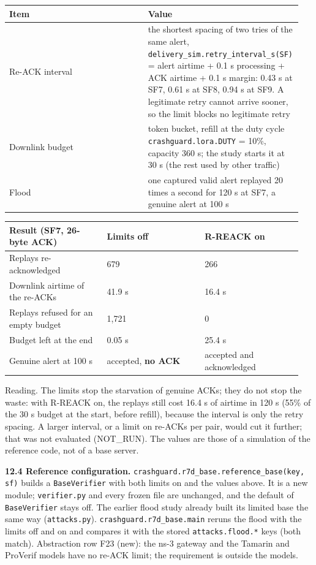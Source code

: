 {\scriptsize\raggedright
\begin{longtable}{p{0.475\linewidth}p{0.475\linewidth}}
\toprule
Item & Value \\
\midrule
\endhead
Re-ACK interval & the shortest spacing of two tries of the same alert, \texttt{delivery\_sim.retry\_interval\_s(SF)} = alert airtime + 0.1 s processing + ACK airtime + 0.1 s margin: 0.43 s at SF7, 0.61 s at SF8, 0.94 s at SF9. A legitimate retry cannot arrive sooner, so the limit blocks no legitimate retry \\
Downlink budget & token bucket, refill at the duty cycle \texttt{crashguard.lora.DUTY} = 10\%, capacity 360 s; the study starts it at 30 s (the rest used by other traffic) \\
Flood & one captured valid alert replayed 20 times a second for 120 s at SF7, a genuine alert at 100 s \\
\bottomrule
\end{longtable}}

{\scriptsize\raggedright
\begin{longtable}{p{0.317\linewidth}p{0.317\linewidth}p{0.317\linewidth}}
\toprule
Result (SF7, 26-byte ACK) & Limits off & R-REACK on \\
\midrule
\endhead
Replays re-acknowledged & 679 & 266 \\
Downlink airtime of the re-ACKs & 41.9 s & 16.4 s \\
Replays refused for an empty budget & 1,721 & 0 \\
Budget left at the end & 0.05 s & 25.4 s \\
Genuine alert at 100 s & accepted, \textbf{no ACK} & accepted and acknowledged \\
\bottomrule
\end{longtable}}

Reading. The limits stop the starvation of genuine ACKs; they do not stop the waste: with R-REACK on, the replays still cost 16.4 s of airtime in 120 s (55\% of the 30 s budget at the start, before refill), because the interval is only the retry spacing. A larger interval, or a limit on re-ACKs per pair, would cut it further; that was not evaluated (NOT\_RUN). The values are those of a simulation of the reference code, not of a base server.

\textbf{12.4 Reference configuration.} \texttt{crashguard.r7d\_base.reference\_base(key, sf)} builds a \texttt{BaseVerifier} with both limits on and the values above. It is a new module; \texttt{verifier.py} and every frozen file are unchanged, and the default of \texttt{BaseVerifier} stays off. The earlier flood study already built its limited base the same way (\texttt{attacks.py}). \texttt{crashguard.r7d\_base.main} reruns the flood with the limits off and on and compares it with the stored \texttt{attacks.flood.*} keys (both match). Abstraction row F23 (new): the ns-3 gateway and the Tamarin and ProVerif models have no re-ACK limit; the requirement is outside the models.


